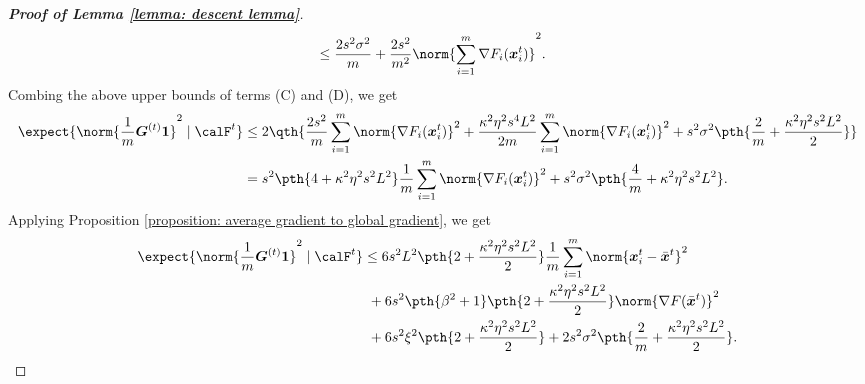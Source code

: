 \documentclass[letterpaper, 10 pt, conference]{ieeeconf}  %
\newcommand{\x}{{\bm x}}
\begin{document}
\begin{proof}[\bf Proof of Lemma \ref{lemma: descent lemma}]
\begin{align*}
& \le \frac{2s^2 \sigma^2}{m}+ \frac{2s^2}{m^2}\norm{\sum_{i=1}^m  \nabla F_i(\x_i^t)}^2.
\end{align*}
Combing the above upper bounds of terms (C) and (D), we get 
\begin{align*}
\expect{\norm{\frac{1}{m} \bm{G}^{(t)} \bm{1}}^2 \mid \calF^{t}}  
& \le 2\qth{\frac{2s^2}{m} \sum_{i=1}^m \norm{\nabla F_i(\x_i^t)}^2 + \frac{\kappa^2 \eta^2 s^4 L^2}{2m} \sum_{i=1}^m \norm{\nabla F_i(\x_i^t)}^2  + s^2\sigma^2\pth{\frac{2}{m} + \frac{\kappa^2 \eta^2 s^2 L^2}{2}}} \\
& = s^2\pth{4 +\kappa^2 \eta^2 s^2 L^2 } \frac{1}{m}\sum_{i=1}^m \norm{\nabla F_i(\x_i^t)}^2 + s^2\sigma^2\pth{\frac{4}{m} + \kappa^2 \eta^2 s^2 L^2}.  
\end{align*}
Applying Proposition \ref{proposition: average gradient to global gradient}, we get 
\begin{align}
\label{eq: bound 2}
\nonumber
\expect{\norm{\frac{1}{m} \bm{G}^{(t)} \bm{1}}^2 \mid \calF^{t}} 
& \le 6 s^2L^2\pth{2 +\frac{\kappa^2 \eta^2 s^2 L^2}{2}} \frac{1}{m} \sum_{i=1}^m \norm{\x_i^t - \bar{\x}^t}^2 \\
\nonumber
& ~ +6 s^2\pth{\beta^2 + 1}\pth{2 +\frac{\kappa^2 \eta^2 s^2 L^2}{2}}\norm{\nabla F(\bar{\x}^t)}^2 \\
& ~ + 6 s^2\xi^2 \pth{2 +\frac{\kappa^2 \eta^2 s^2 L^2}{2}} + 2 s^2\sigma^2\pth{\frac{2}{m} + \frac{\kappa^2 \eta^2 s^2 L^2}{2}}. 
\end{align}

\end{proof}
\end{document}

